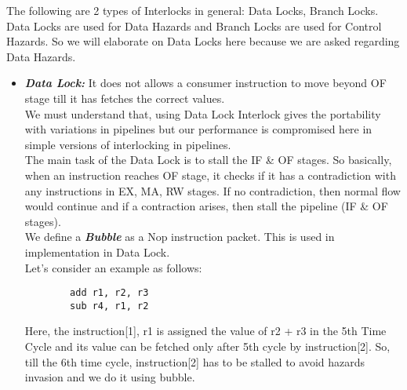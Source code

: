 \documentclass[12pt]{article}
\begin{document}
The following are 2 types of Interlocks in general: Data Locks, Branch Locks. Data Locks are used for Data Hazards and Branch Locks are used for Control Hazards. So we will elaborate on Data Locks here because we are asked regarding Data Hazards.
\begin{itemize}
    \item \textbf{\textit{Data Lock:}} It does not allows a consumer instruction to move beyond OF stage till it has fetches the correct values. \\
    
    We must understand that, using Data Lock Interlock gives the portability with variations in pipelines but our performance is compromised here in simple versions of interlocking in pipelines.\\ 
    
    The main task of the Data Lock is to stall the IF \& OF stages. So basically, when an instruction reaches OF stage, it checks if it has a contradiction with any instructions in EX, MA, RW stages. If no contradiction, then normal flow would continue and if a contraction arises, then stall the pipeline (IF \& OF stages).\\
    
    We define a \textbf{\textit{Bubble}} as a Nop instruction packet. This is used in implementation in Data Lock. \\
    
    Let's consider an example as follows:
    \begin{verbatim}
        add r1, r2, r3
        sub r4, r1, r2
    \end{verbatim}

    Here, the instruction[1], r1 is assigned the value of r2 + r3 in the 5th Time Cycle and its value can be fetched only after 5th cycle by instruction[2]. So, till the 6th time cycle, instruction[2] has to be stalled to avoid hazards invasion and we do it using bubble.


\end{itemize}
\end{document}
